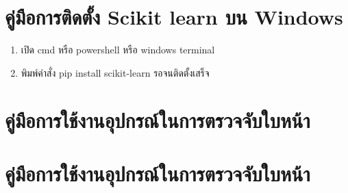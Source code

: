 \section{คู่มือการติดตั้ง Scikit learn บน Windows}
\begin{enumerate}
  \item เปิด cmd หรือ powershell หรือ windows terminal
  \item พิมพ์คำสั่ง pip install scikit-learn รอจนติดตั้งเสร็จ
\end{enumerate}


\section{คู่มือการใช้งานอุปกรณ์ในการตรวจจับใบหน้า}



\section{คู่มือการใช้งานอุปกรณ์ในการตรวจจับใบหน้า}
